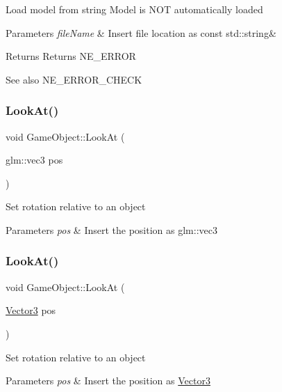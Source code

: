 Load model from string Model is N\+OT automatically loaded 
\begin{DoxyParams}{Parameters}
{\em file\+Name} & Insert file location as const std\+::string\& \\
\hline
\end{DoxyParams}
\begin{DoxyReturn}{Returns}
Returns N\+E\+\_\+\+E\+R\+R\+OR 
\end{DoxyReturn}
\begin{DoxySeeAlso}{See also}
N\+E\+\_\+\+E\+R\+R\+O\+R\+\_\+\+C\+H\+E\+CK 
\end{DoxySeeAlso}
\mbox{\label{class_game_object_a1ba510555d772c1bd90c367af5170527}} 
\subsubsection{\texorpdfstring{LookAt()}{LookAt()}\hspace{0.1cm}{\footnotesize\ttfamily [1/5]}}
{\footnotesize\ttfamily void Game\+Object\+::\+Look\+At (\begin{DoxyParamCaption}\item[{glm\+::vec3}]{pos }\end{DoxyParamCaption})}

Set rotation relative to an object 
\begin{DoxyParams}{Parameters}
{\em pos} & Insert the position as glm\+::vec3 \\
\hline
\end{DoxyParams}
\mbox{\label{class_game_object_a0f791ccc7199b037943e3df61e54388f}} 
\subsubsection{\texorpdfstring{LookAt()}{LookAt()}\hspace{0.1cm}{\footnotesize\ttfamily [2/5]}}
{\footnotesize\ttfamily void Game\+Object\+::\+Look\+At (\begin{DoxyParamCaption}\item[{\mbox{\hyperlink{struct_vector3}{Vector3}}}]{pos }\end{DoxyParamCaption})}

Set rotation relative to an object 
\begin{DoxyParams}{Parameters}
{\em pos} & Insert the position as \mbox{\hyperlink{struct_vector3}{Vector3}} \\
\hline
\end{DoxyParams}
\mbox{\label{class_game_object_ab6fc8c1ac5466de9b4daba280409cb16}} 

